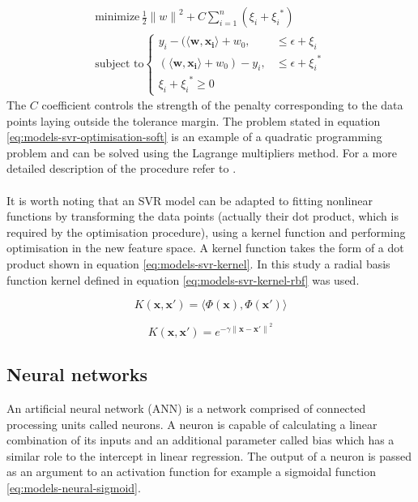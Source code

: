 \begin{equation}\label{eq:models-svr-optimisation-soft}
\begin{gathered}
    \text{minimize}\, \frac{1}{2} {\lVert {w} \rVert}^2 + C\sum_{i = 1}^{n} ({\xi}_i + {{\xi}_i}^*) \\
    \text{subject to}
    \begin{cases}
        y_i - (\langle \bm{w}, \bm{x_i} \rangle + w_0, & \leq \epsilon + {\xi}_i \\
        (\langle \bm{w}, \bm{x_i} \rangle + w_0) - y_i, & \leq \epsilon + {{\xi}_i}^* \\
        {\xi}_i + {{\xi}_i}^* \geq 0
    \end{cases}
\end{gathered}
\end{equation}
The $C$ coefficient controls the strength of the penalty corresponding to the data points laying outside the tolerance margin. The problem stated in equation \ref{eq:models-svr-optimisation-soft} is an example of a quadratic programming problem and can be solved using the Lagrange multipliers method. For a more detailed description of the procedure refer to \cite{SMOLA2003}.
\\\\
It is worth noting that an SVR model can be adapted to fitting nonlinear functions by transforming the data points (actually their dot product, which is required by the optimisation procedure), using a kernel function and performing optimisation in the new feature space. A kernel function takes the form of a dot product shown in equation \ref{eq:models-svr-kernel}. In this study a radial basis function kernel defined in equation \ref{eq:models-svr-kernel-rbf} was used.

\begin{equation}\label{eq:models-svr-kernel}
K(\bm{x}, \bm{x'}) = \langle \Phi(\bm{x}), \Phi(\bm{x'}) \rangle
\end{equation}

\begin{equation}\label{eq:models-svr-kernel-rbf}
K(\bm{x}, \bm{x'}) = e^{-\gamma {\lVert \bm{x} - \bm{x'} \rVert}^2}
\end{equation}

\subsection{Neural networks}
An artificial neural network (ANN) is a network comprised of connected processing units called neurons. A neuron is capable of calculating a linear combination of its inputs and an additional parameter called bias which has a similar role to the intercept in linear regression. The output of a neuron is passed as an argument to an activation function for example a sigmoidal function \ref{eq:models-neural-sigmoid}.

